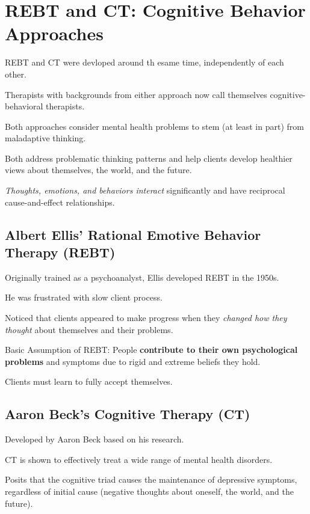 \section{REBT and CT: Cognitive Behavior Approaches}

\begin{coloredlist}
    \item REBT and CT were devloped around th esame time, independently of each other.
    \item Therapists with backgrounds from either approach now call themselves cognitive-behavioral therapists.
    \item Both approaches consider mental health problems to stem (at least in part) from maladaptive thinking.
    \item Both address problematic thinking patterns and help clients develop healthier views about themselves, the world, and the future.
    \item \textit{Thoughts, emotions, and behaviors interact} significantly and have reciprocal cause-and-effect relationships.
\end{coloredlist}

\subsection{Albert Ellis' Rational Emotive Behavior Therapy (REBT)}

\begin{coloredlist}
    \item Originally trained as a psychoanalyst, Ellis developed REBT in the 1950s.
    \item He was frustrated with slow client process.
    \item Noticed that clients appeared to make progress when they \textit{changed how they thought} about themselves and their problems.
    \item Basic Assumption of REBT: People \textbf{contribute to their own psychological problems} and symptoms due to rigid and extreme beliefs they hold.
    \item Clients must learn to fully accept themselves.
\end{coloredlist}

\subsection{Aaron Beck's Cognitive Therapy (CT)}

\begin{coloredlist}
    \item Developed by Aaron Beck based on his research.
    \item CT is shown to effectively treat a wide range of mental health disorders.
    \item Posits that the cognitive triad causes the maintenance of depressive symptoms, regardless of initial cause (negative thoughts about oneself, the world, and the future).
\end{coloredlist}

